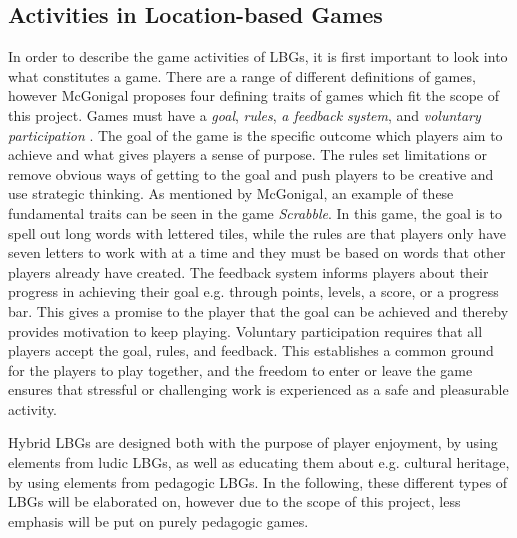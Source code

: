 \subsection{Activities in Location-based Games}
In order to describe the game activities of LBGs, it is first important to look into what constitutes a game. There are a range of different definitions of games, however McGonigal proposes four defining traits of games which fit the scope of this project. Games must have a \textit{goal}, \textit{rules}, \textit{a feedback system}, and \textit{voluntary participation} \cite{RealityIsBroken}. The goal of the game is the specific outcome which players aim to achieve and what gives players a sense of purpose. The rules set limitations or remove obvious ways of getting to the goal and push players to be creative and use strategic thinking. As mentioned by McGonigal, an example of these fundamental traits can be seen in the game \textit{Scrabble}. In this game, the goal is to spell out long words with lettered tiles, while the rules are that players only have seven letters to work with at a time and they must be based on words that other players already have created. The feedback system informs players about their progress in achieving their goal e.g. through points, levels, a score, or a progress bar. This gives a promise to the player that the goal can be achieved and thereby provides motivation to keep playing. Voluntary participation requires that all players accept the goal, rules, and feedback. This establishes a common ground for the players to play together, and the freedom to enter or leave the game ensures that stressful or challenging work is experienced as a safe and pleasurable activity. 

Hybrid LBGs are designed both with the purpose of player enjoyment, by using elements from ludic LBGs, as well as educating them about e.g. cultural heritage, by using elements from pedagogic LBGs\cite{LBG_Review}. In the following, these different types of LBGs will be elaborated on, however due to the scope of this project, less emphasis will be put on purely pedagogic games.

